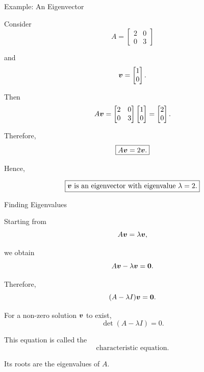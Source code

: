 
\begin{frame}{Example: An Eigenvector}

Consider
\vspace{-0.1cm}
\[
A=
\begin{bmatrix}
2&0\\
0&3
\end{bmatrix}
\]

and
\vspace{-0.1cm}
\[
\bm{v}
=
\begin{bmatrix}
1\\0
\end{bmatrix}.
\]

Then
\vspace{-0.1cm}
\[
A\bm{v}
=
\begin{bmatrix}
2&0\\
0&3
\end{bmatrix}
\begin{bmatrix}
1\\0
\end{bmatrix}
=
\begin{bmatrix}
2\\0
\end{bmatrix}.
\]

Therefore,
\vspace{-0.1cm}
\[
\boxed{
A\bm{v}=2\bm{v}.
}
\]

Hence,

\[
\boxed{
\bm{v}
\text{ is an eigenvector with eigenvalue }
\lambda=2.
}
\]

\end{frame}



\begin{frame}{Finding Eigenvalues}

Starting from
\vspace{-0.1cm}
\[
A\bm{v}=\lambda\bm{v},
\]

we obtain
\vspace{-0.1cm}
\[
A\bm{v}-\lambda\bm{v}
=
\mathbf{0}.
\]

Therefore,
\vspace{-0.1cm}
\[
(A-\lambda I)\bm{v}
=
\mathbf{0}.
\]

For a non-zero solution $\bm{v}$ to exist,
\vspace{-0.1cm}
\[
\boxed{
\det(A-\lambda I)=0.
}
\]

This equation is called the
\vspace{-0.1cm}
\[
\boxed{
\text{characteristic equation}.
}
\]

Its roots are the eigenvalues of $A$.

\end{frame}


